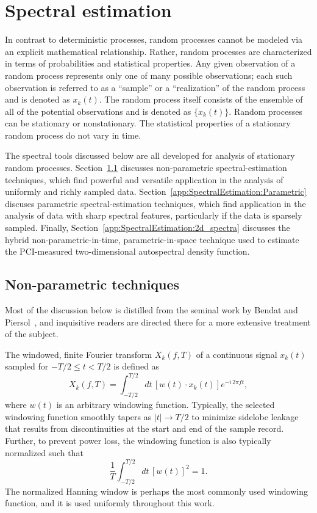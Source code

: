 \chapter{Spectral estimation}
\label{app:SpectralEstimation}
In contrast to deterministic processes,
random processes cannot be modeled via an explicit mathematical relationship.
Rather, random processes are characterized
in terms of probabilities and statistical properties.
Any given observation of a random process represents
only one of many possible observations;
each such observation is referred to as
a ``sample'' or a ``realization'' of the random process
and is denoted as $x_k(t)$.
The random process itself consists of
the ensemble of all of the potential observations
and is denoted as $\{x_k(t)\}$.
Random processes can be stationary or nonstationary.
The statistical properties of a stationary random process
do not vary in time.

The spectral tools discussed below
are all developed for analysis of stationary random processes.
Section~\ref{app:SpectralEstimation:NonParametric}
discusses non-parametric spectral-estimation techniques,
which find powerful and versatile application
in the analysis of uniformly and richly sampled data.
Section~\ref{app:SpectralEstimation:Parametric}
discuses parametric spectral-estimation techniques,
which find application
in the analysis of data with sharp spectral features,
particularly if the data is sparsely sampled.
Finally, Section~\ref{app:SpectralEstimation:2d_spectra}
discusses the hybrid non-parametric-in-time, parametric-in-space
technique used to estimate the PCI-measured
two-dimensional autospectral density function.


\section{Non-parametric techniques}
\label{app:SpectralEstimation:NonParametric}
Most of the discussion below is distilled from
the seminal work by Bendat and Piersol~\cite{bendat_and_piersol}, and
inquisitive readers are directed there
for a more extensive treatment of the subject.

The windowed, finite Fourier transform $X_k(f, T)$
of a continuous signal $x_k(t)$
sampled for $-T / 2 \leq t < T / 2$
is defined as
\begin{equation}
  X_k(f, T)
  =
  \int_{-T / 2}^{T / 2}
  dt \, [w(t) \cdot x_k(t)] e^{-i \, 2 \pi f t},
  \label{eq:SpectralEstimation:finite_Fourier_transform}
\end{equation}
where $w(t)$ is an arbitrary windowing function.
Typically, the selected windowing function smoothly tapers
as $|t| \rightarrow T / 2$
to minimize sidelobe leakage
that results from discontinuities at the start and end of the sample record.
Further, to prevent power loss, the windowing function
is also typically normalized such that
\begin{equation}
  \frac{1}{T} \int_{-T/2}^{T/2} dt \, [w(t)]^2 = 1.
\end{equation}
The normalized Hanning window is perhaps
the most commonly used windowing function, and
it is used uniformly throughout this work.

